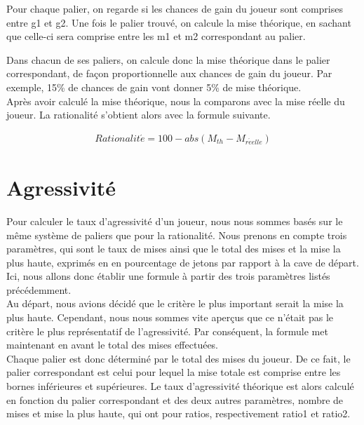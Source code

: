 \documentclass{report}
\begin{document}
Pour chaque palier, on regarde si les chances de gain du joueur sont comprises entre g1 et g2. Une fois le palier trouvé, on calcule la mise théorique, en sachant que celle-ci sera comprise entre les m1 et m2 correspondant au palier. \par
Dans chacun de ses paliers, on calcule donc la mise théorique dans le palier correspondant, de façon proportionnelle aux chances de gain du joueur. Par exemple, 15\% de chances de gain vont donner 5\% de mise théorique.\\
	
Après avoir calculé la mise théorique, nous la comparons avec la mise réelle du joueur. La rationalité s’obtient alors avec la formule suivante. \par

\begin{align*}
Rationalit\acute{e} = 100-abs(M_{th}-M_{r\acute{e}elle})
\end{align*}



\section{Agressivité}

\hspace{0.5cm}Pour calculer le taux d'agressivité d'un joueur, nous nous sommes basés sur le même système de paliers que pour la rationalité. Nous prenons en compte trois paramètres, qui sont le taux de mises ainsi que le total des mises et la mise la plus haute, exprimés en en pourcentage de jetons par rapport à la cave de départ. Ici, nous allons donc établir une formule à partir des trois paramètres listés précédemment.\\

Au départ, nous avions décidé que le critère le plus important serait la mise la plus haute. Cependant, nous nous sommes vite aperçus que ce n'était pas le critère le plus représentatif de l'agressivité. Par conséquent, la formule met maintenant en avant le total des mises effectuées.\\

Chaque palier est donc déterminé par le total des mises du joueur. De ce fait, le palier correspondant est celui pour lequel la mise totale est comprise entre les bornes inférieures et supérieures. Le taux d'agressivité théorique est alors calculé en fonction du palier correspondant et des deux autres paramètres, nombre de mises et mise la plus haute, qui ont pour ratios, respectivement ratio1 et ratio2. \\
\end{document}
